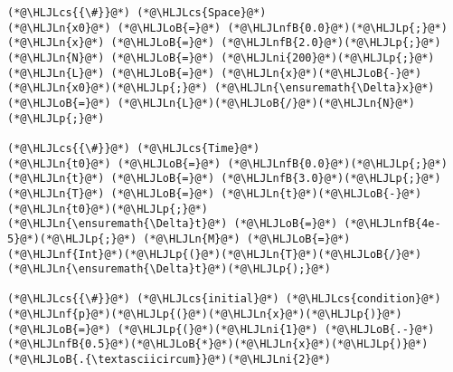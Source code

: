 \documentclass[12pt,a4paper]{article}
\newcommand{\HLJLn}[1]{#1}
\newcommand{\HLJLnf}[1]{\textcolor[RGB]{66,102,213}{#1}}
\newcommand{\HLJLnfB}[1]{\textcolor[RGB]{59,151,46}{#1}}
\newcommand{\HLJLni}[1]{\textcolor[RGB]{59,151,46}{#1}}
\newcommand{\HLJLoB}[1]{\textcolor[RGB]{102,102,102}{\textbf{#1}}}
\newcommand{\HLJLp}[1]{#1}
\newcommand{\HLJLcs}[1]{\textcolor[RGB]{153,153,119}{\textit{#1}}}
\begin{document}
\begin{lstlisting}
(*@\HLJLcs{{\#}}@*) (*@\HLJLcs{Space}@*)
(*@\HLJLn{x0}@*) (*@\HLJLoB{=}@*) (*@\HLJLnfB{0.0}@*)(*@\HLJLp{;}@*) (*@\HLJLn{x}@*) (*@\HLJLoB{=}@*) (*@\HLJLnfB{2.0}@*)(*@\HLJLp{;}@*)
(*@\HLJLn{N}@*) (*@\HLJLoB{=}@*) (*@\HLJLni{200}@*)(*@\HLJLp{;}@*) (*@\HLJLn{L}@*) (*@\HLJLoB{=}@*) (*@\HLJLn{x}@*)(*@\HLJLoB{-}@*)(*@\HLJLn{x0}@*)(*@\HLJLp{;}@*) (*@\HLJLn{\ensuremath{\Delta}x}@*) (*@\HLJLoB{=}@*) (*@\HLJLn{L}@*)(*@\HLJLoB{/}@*)(*@\HLJLn{N}@*)(*@\HLJLp{;}@*)

(*@\HLJLcs{{\#}}@*) (*@\HLJLcs{Time}@*)
(*@\HLJLn{t0}@*) (*@\HLJLoB{=}@*) (*@\HLJLnfB{0.0}@*)(*@\HLJLp{;}@*) (*@\HLJLn{t}@*) (*@\HLJLoB{=}@*) (*@\HLJLnfB{3.0}@*)(*@\HLJLp{;}@*) 
(*@\HLJLn{T}@*) (*@\HLJLoB{=}@*) (*@\HLJLn{t}@*)(*@\HLJLoB{-}@*)(*@\HLJLn{t0}@*)(*@\HLJLp{;}@*)
(*@\HLJLn{\ensuremath{\Delta}t}@*) (*@\HLJLoB{=}@*) (*@\HLJLnfB{4e-5}@*)(*@\HLJLp{;}@*) (*@\HLJLn{M}@*) (*@\HLJLoB{=}@*) (*@\HLJLnf{Int}@*)(*@\HLJLp{(}@*)(*@\HLJLn{T}@*)(*@\HLJLoB{/}@*)(*@\HLJLn{\ensuremath{\Delta}t}@*)(*@\HLJLp{);}@*)

(*@\HLJLcs{{\#}}@*) (*@\HLJLcs{initial}@*) (*@\HLJLcs{condition}@*)
(*@\HLJLnf{p}@*)(*@\HLJLp{(}@*)(*@\HLJLn{x}@*)(*@\HLJLp{)}@*) (*@\HLJLoB{=}@*) (*@\HLJLp{(}@*)(*@\HLJLni{1}@*) (*@\HLJLoB{.-}@*)(*@\HLJLnfB{0.5}@*)(*@\HLJLoB{*}@*)(*@\HLJLn{x}@*)(*@\HLJLp{)}@*)(*@\HLJLoB{.{\textasciicircum}}@*)(*@\HLJLni{2}@*)


\end{lstlisting}
\end{document}
